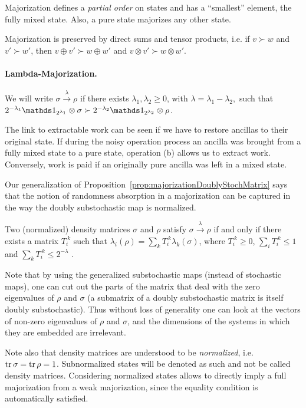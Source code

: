 \documentclass[12pt,a4paper]{article}
\newcommand{\lambdamaj}[1]{\xrightarrow{#1}}
\begin{document}
Majorization defines a {\em partial order} on states and has a ``smallest'' element, the fully mixed state. Also,
a pure state majorizes any other state.

Majorization is preserved by direct sums and tensor products, i.e. if $v\succ w$ and $v'\succ w'$, then
$v\oplus v' \succ w\oplus w'$ and $v\otimes v' \succ w\otimes w'$.

\paragraph{Lambda-Majorization.} We will write $\sigma\lambdamaj{\lambda}\rho$ if there exists
$\lambda_1,\lambda_2\geqslant 0$, with $\lambda=\lambda_1-\lambda_2,$ such
that $2^{-\lambda_1}\Ident_{2^{\lambda_1}}\otimes\sigma \succ 2^{-\lambda_2}\Ident_{2^{\lambda_2}}\otimes\rho$.

The link to extractable work can be seen if we have to restore ancillas to their original state. If during
the noisy operation process an ancilla was brought from a fully mixed state to a pure state, operation (b)
allows us to extract work. Conversely, work is paid if an originally pure ancilla was left in a mixed
state.

Our generalization of Proposition~\ref{prop:majorizationDoublyStochMatrix} says that the notion of
randomness absorption in a majorization can be captured in
the way the doubly substochastic map is normalized.
\begin{prop}
  \label{prop:LambdaMajTik}
  Two (normalized) density matrices $\sigma$ and $\rho$ satisfy $\sigma\lambdamaj{\lambda}\rho$
  if and only if there exists a matrix $T_i^{~k}$ such that $\lambda_i(\rho) = \sum_k T_i^{~k}\lambda_k(\sigma)$,
  where $T_i^{~k}\geqslant 0$, $\sum_i T_i^{~k} \leqslant 1$ and $\sum_k T_i^{~k} \leqslant 2^{-\lambda}$ .
\end{prop}

Note that by using the generalized substochastic maps (instead of stochastic maps), one can cut out the parts
of the matrix that deal with the zero eigenvalues of $\rho$ and $\sigma$ (a submatrix of a doubly substochastic
matrix is itself doubly substochastic). Thus without loss of generality one can look at the vectors of
non-zero eigenvalues of $\rho$ and $\sigma$, and the dimensions of the systems in which they are embedded are
irrelevant.

Note also that density matrices are understood to be {\em normalized}, i.e. $\operatorname{tr}\sigma=\operatorname{tr}\rho=1$. Subnormalized
states will be denoted as such and not be called density matrices. Considering normalized states allows to
directly imply a full majorization from a weak majorization, since the equality condition is automatically
satisfied.
\end{document}
